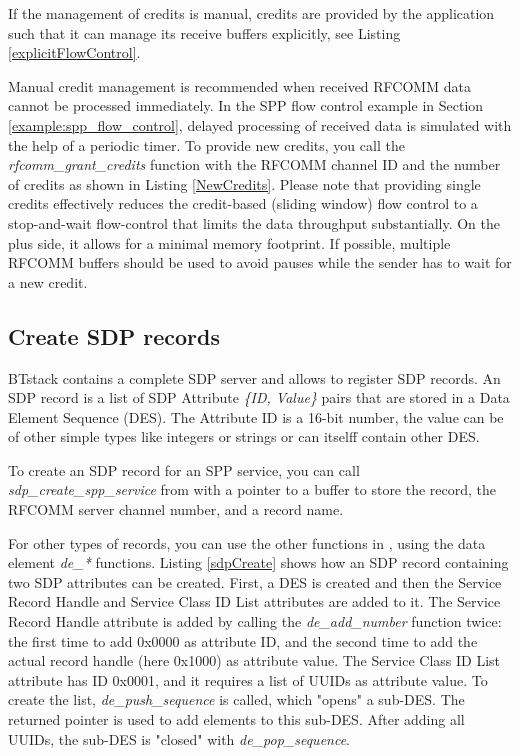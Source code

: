 \documentclass[a4paper,titlepage,oneside,12pt]{amsart} %
\newcommand{\urlfoot}[2]{\href{#1}{{\color{blue} #2}}\footnote{#1}}
\begin{document}
If the management of credits is manual, credits are provided by the application such that it can manage its receive buffers explicitly, see Listing \ref{explicitFlowControl}.

Manual credit management is recommended when received RFCOMM data cannot be processed immediately. In the SPP flow control example in Section \ref{example:spp_flow_control}, delayed processing of received data is simulated with the help of a periodic timer. To provide new credits, you call the \emph{rfcomm\_grant\_credits} function with the RFCOMM channel ID and the number of credits as shown in Listing \ref{NewCredits}.
Please note that providing single credits effectively reduces the credit-based (sliding window) flow control to a stop-and-wait flow-control that limits the data throughput substantially. On the plus side, it allows for a minimal memory footprint. If possible, multiple RFCOMM buffers should be used to avoid pauses while the sender has to wait for a new credit.


\subsection{Create SDP records}
BTstack contains a complete SDP server and allows to register SDP records. An SDP record is a list of SDP Attribute \emph{\{ID, Value\}} pairs that are stored in a Data Element Sequence (DES). The Attribute ID is a 16-bit number, the value can be of other simple types like integers or strings or can itselff contain other DES. 


To create an SDP record for an SPP service, you can call \emph{sdp\_create\_spp\_service} from  with a pointer to a buffer to store the record, the \mbox{RFCOMM} server channel number, and a record name. 

For other types of records, you can use the other functions in , using the data element \emph{de\_*} functions.  Listing \ref{sdpCreate} shows how an SDP record containing two SDP attributes can be created. First, a DES is created and then the Service Record Handle and Service Class ID List attributes are added to it. The Service Record Handle attribute is added by calling the \emph{de\_add\_number} function twice: the first time to add 0x0000 as attribute ID, and the second time to add the actual record handle (here 0x1000) as attribute value. The Service Class ID List attribute has ID 0x0001, and it requires a list of UUIDs as attribute value. To create the list, \emph{de\_push\_sequence} is called, which "opens" a sub-DES. The returned pointer is used to add elements to this sub-DES. After adding all UUIDs, the sub-DES is "closed" with \emph{de\_pop\_sequence}.
\end{document}
